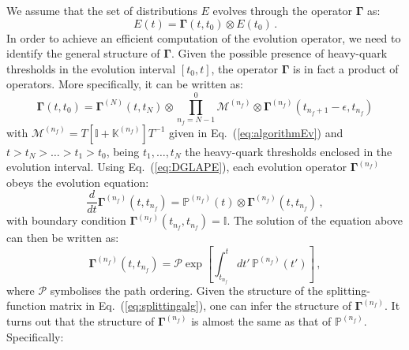 \documentclass[10pt,a4paper]{article}
\begin{document}
We assume that the set of distributions $E$ evolves through the
operator ${\bm\Gamma}$ as:
\begin{equation}
  E(t) = {\bm\Gamma}(t,t_0)\otimes E(t_0)\,.
\end{equation}
In order to achieve an efficient computation of the evolution
operator, we need to identify the general structure of ${\bm \Gamma}$.
Given the possible presence of heavy-quark thresholds in the evolution
interval $[t_0,t]$, the operator ${\bm\Gamma}$ is in fact a product of
operators. More specifically, it can be written as:
\begin{equation}\label{eq:conbevop}
{\bm\Gamma}(t,t_0)= {\bm\Gamma}^{(N)}(t,t_N) \otimes\prod_{n_f=N-1}^{0} \mathcal{M}^{(n_f)}\otimes{\bm\Gamma}^{(n_f)}(t_{n_f+1}-\epsilon,t_{n_f})
\end{equation}
with
$\mathcal{M}^{(n_f)} =
T\left[\mathbb{I}+\mathbb{K}^{(n_f)}\right]T^{-1}$
given in Eq.~(\ref{eq:algorithmEv}) and $t>t_N>\dots>t_1>t_0$, being
$t_1,\dots,t_N$ the heavy-quark thresholds enclosed in the evolution
interval. Using Eq.~(\ref{eq:DGLAPE}), each evolution operator
${\bm\Gamma}^{(n_f)}$ obeys the evolution equation:
\begin{equation}\label{eq:DGLAPG}
  \frac{d}{dt}{\bm\Gamma}^{(n_f)}(t,t_{n_f}) = \mathbb{P}^{(n_f)}(t)\otimes {\bm\Gamma}^{(n_f)}(t,t_{n_f})\,,
\end{equation}
with boundary condition
${\bm\Gamma}^{(n_f)}(t_{n_f},t_{n_f})=\mathbb{I}$. The solution of the
equation above can then be written as:
\begin{equation}
  {\bm\Gamma}^{(n_f)}(t,t_{n_f}) = \mathcal{P}\exp\left[\int_{t_{n_f}}^tdt'\,\mathbb{P}^{(n_f)}(t')\right]\,,
\end{equation}
where $\mathcal{P}$ symbolises the path ordering. Given the structure
of the splitting-function matrix in Eq.~(\ref{eq:splittingalg}), one
can infer the structure of ${\bm \Gamma}^{(n_f)}$. It turns out that
the structure of ${\bm \Gamma^{(n_f)}}$ is almost the same as that of
$\mathbb{P}^{(n_f)}$. Specifically:
\end{document}
